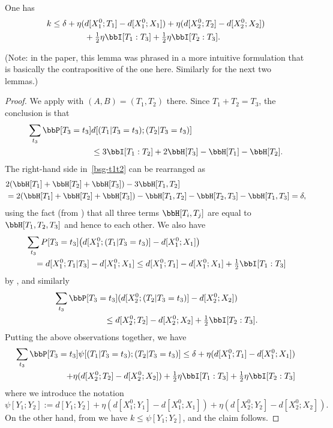 \begin{lemma}\label{construct-good-prelim}
  \leanok
  One has
  \begin{align*}  k \leq
    \delta + \eta (& d[X^0_1;T_1]-d[X^0_1;X_1])
      + \eta (d[X^0_2;T_2]-d[X^0_2;X_2]) \\ & + \tfrac12 \eta \bbI[T_1:T_3] + \tfrac12 \eta \bbI[T_2:T_3].
  \end{align*}
\end{lemma}

(Note: in the paper, this lemma was phrased in a more intuitive formulation that is basically the contrapositive of the one here. Similarly for the next two lemmas.)

\begin{proof}\leanok
  We apply  with $(A,B) = (T_1, T_2)$ there.
  Since $T_1 + T_2 = T_3$, the conclusion is that
  \begin{align} \nonumber \sum_{t_3} \bbP[T_3 = t_3] & d[(T_1 | T_3 = t_3); (T_2 | T_3 = t_3)] \\ & \leq 3 \bbI[T_1 : T_2] + 2 \bbH[T_3] - \bbH[T_1] - \bbH[T_2].\label{bsg-t1t2}
  \end{align}
  The right-hand side in~\eqref{bsg-t1t2} can be rearranged as
  \begin{align*} & 2( \bbH[T_1] + \bbH[T_2] + \bbH[T_3]) - 3 \bbH[T_1,T_2] \\ & = 2(\bbH[T_1] + \bbH[T_2] + \bbH[T_3]) - \bbH[T_1,T_2] - \bbH[T_2,T_3] - \bbH[T_1, T_3] = \delta,\end{align*}
  using the fact (from ) that all three terms $\bbH[T_i,T_j]$ are equal to $\bbH[T_1,T_2,T_3]$ and hence to each other.
  We also have
  \begin{align*}
  &  \sum_{t_3} P[T_3 = t_3] \bigl(d[X^0_1; (T_1 | T_3=t_3)] - d[X^0_1;X_1]\bigr) \\
  &\quad = d[X^0_1; T_1 | T_3] - d[X^0_1;X_1] \leq d[X^0_1;T_1] - d[X^0_1;X_1] + \tfrac{1}{2} \bbI[T_1 : T_3]
  \end{align*}
  by , and similarly
  \begin{align*}
  &  \sum_{t_3} \bbP[T_3 = t_3] (d[X^0_2;(T_2 | T_3=t_3)] - d[X^0_2; X_2]) \\
  &\quad\quad\quad\quad\quad\quad \leq d[X^0_2;T_2] - d[X^0_2;X_2] + \tfrac{1}{2} \bbI[T_2 : T_3].
  \end{align*}
  Putting the above observations together, we have
  \begin{align*}
   \sum_{t_3} \bbP[T_3=t_3] \psi[(T_1 | T_3=t_3); (T_2 | T_3=t_3)] \leq \delta + \eta (d[X^0_1;T_1]-d[X^0_1;X_1]) \\
     + \eta (d[X^0_2;T_2]-d[X^0_2;X_2]) + \tfrac12 \eta \bbI[T_1:T_3] + \tfrac12 \eta \bbI[T_2:T_3]
   \end{align*}
where we introduce the notation
\[\psi[Y_1; Y_2] := d[Y_1;Y_2] +  \eta (d[X_1^0;Y_1] - d[X_1^0;X_1]) + \eta(d[X_2^0;Y_2] - d[X_2^0;X_2]).\]
On the other hand, from  we have $k \leq \psi[Y_1;Y_2]$, and the claim follows.
  \end{proof}


